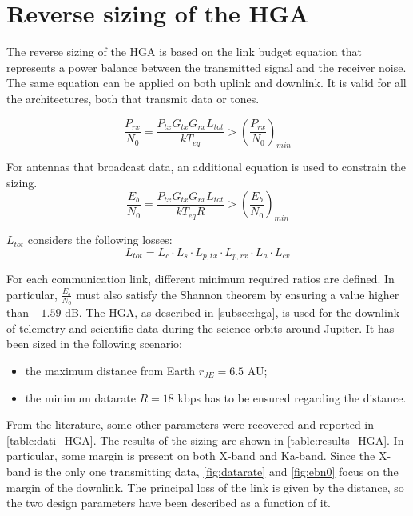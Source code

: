 \section{Reverse sizing of the HGA}
\label{sec:HGA_sizing}

The reverse sizing of the HGA is based on the link budget equation that represents a power balance between the transmitted signal and the receiver noise. The same equation can be applied on both uplink and downlink. It is valid for all the architectures, both that transmit data or tones.

\begin{equation}
    \dfrac{P_{rx}}{N_0} = \dfrac{P_{tx} G_{tx} G_{rx} L_{tot}}{k T_{eq}} > \left( \dfrac{P_{rx}}{N_0} \right)_{min}
\end{equation}

For antennas that broadcast data, an additional equation is used to constrain the sizing.
\begin{equation}
    \dfrac{E_b}{N_0} = \dfrac{P_{tx} G_{tx} G_{rx} L_{tot}}{k T_{eq} R} > \left( \dfrac{E_b}{N_0} \right)_{min}
\end{equation}

$L_{tot}$ considers the following losses:
\begin{equation}
    L_{tot} = L_{c} \cdot L_{s} \cdot L_{p,tx} \cdot L_{p,rx} \cdot L_{a} \cdot L_{cv}
\end{equation}

For each communication link, different minimum required ratios are defined. In particular, $\frac{E_b}{N_0}$ must also satisfy the Shannon theorem by ensuring a value higher than $-1.59$ dB. 
The HGA, as described in \autoref{subsec:hga}, is used for the downlink of telemetry and scientific data during the science orbits around Jupiter. It has been sized in the following scenario: 
\begin{itemize}
    \item the maximum distance from Earth $r_{JE} = 6.5$ AU;
    \item the minimum datarate $R = 18$ kbps has to be ensured regarding the distance.
\end{itemize}

From the literature, some other parameters were recovered and reported in \autoref{table:dati_HGA}. The results of the sizing are shown in \autoref{table:results_HGA}. In particular, some margin is present on both X-band and Ka-band. Since the X-band is the only one transmitting data, \autoref{fig:datarate} and \autoref{fig:ebn0} focus on the margin of the downlink. The principal loss of the link is given by the distance, so the two design parameters have been described as a function of it. 

